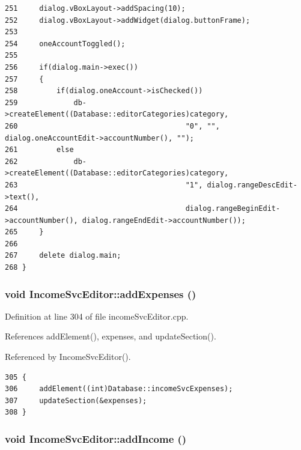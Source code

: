 \begin{verbatim}
251     dialog.vBoxLayout->addSpacing(10);
252     dialog.vBoxLayout->addWidget(dialog.buttonFrame);
253     
254     oneAccountToggled();
255     
256     if(dialog.main->exec())
257     {
258         if(dialog.oneAccount->isChecked())
259             db->createElement((Database::editorCategories)category,
260                                       "0", "", dialog.oneAccountEdit->accountNumber(), "");
261         else
262             db->createElement((Database::editorCategories)category,
263                                       "1", dialog.rangeDescEdit->text(),
264                                       dialog.rangeBeginEdit->accountNumber(), dialog.rangeEndEdit->accountNumber());
265     }
266     
267     delete dialog.main;
268 }
\end{verbatim}\normalsize 


\hypertarget{classIncomeSvcEditor_k3}{
\subsubsection[addExpenses]{\setlength{\rightskip}{0pt plus 5cm}void Income\-Svc\-Editor::add\-Expenses ()}}
\label{classIncomeSvcEditor_k3}


Definition at line 304 of file income\-Svc\-Editor.cpp.

References add\-Element(), expenses, and update\-Section().

Referenced by Income\-Svc\-Editor().

\footnotesize\begin{verbatim}305 {
306     addElement((int)Database::incomeSvcExpenses);
307     updateSection(&expenses);
308 }
\end{verbatim}\normalsize 


\hypertarget{classIncomeSvcEditor_k2}{
\subsubsection[addIncome]{\setlength{\rightskip}{0pt plus 5cm}void Income\-Svc\-Editor::add\-Income ()}}
\label{classIncomeSvcEditor_k2}



